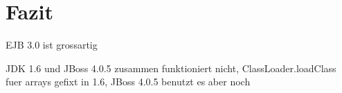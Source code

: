 \section{Fazit}
\label{sec:chap2:fazit}

EJB 3.0 ist grossartig

JDK 1.6 und JBoss 4.0.5 zusammen funktioniert nicht, ClassLoader.loadClass fuer arrays gefixt in 1.6,
JBoss 4.0.5 benutzt es aber noch



